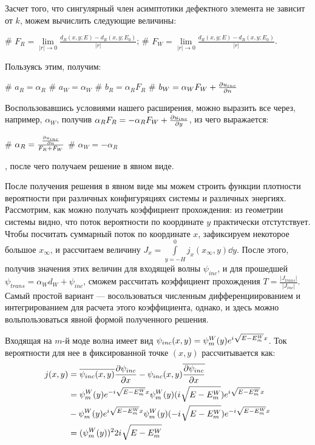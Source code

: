 Засчет того, что сингулярный член асимптотики дефектного элемента не зависит от $k$, можем вычислить следующие величины:
\begin{ilist}
# $F_R = \lim\limits_{|r| \to 0} \frac{d_R(x, y; E) - d_R(x, y; E_0)}{|r|}$;
# $F_W = \lim\limits_{|r| \to 0} \frac{d_R(x, y; E) - d_R(x, y; E_0)}{|r|}$.
\end{ilist}

Пользуясь этим, получим:
\begin{ilist}
# $a_R = \alpha_R$
# $a_W = \alpha_W$
# $b_R = \alpha_R F_R$
# $b_W = \alpha_W F_W + \pdv{u_{inc}}{n} (\vb{0})$
\end{ilist}

Воспользовавшись условиями нашего расширения, можно выразить все через, например, $\alpha_W$, получив $\alpha_R F_R = - \alpha_R F_W  + \pdv{u_{inc}}{y} (\vb{0})$, из чего выражается:
\begin{ilist}
# $\alpha_R = \frac{\pdv{u_{inc}}{n} (\vb{0})}{F_R + F_W}$
# $\alpha_W = - \alpha_R$
\end{ilist}
, после чего получаем решение в явном виде.

После получения решения в явном виде мы можем строить функции плотности вероятности при различных конфигуряциях системы и различных энергиях. Рассмотрим, как можно получать коэффициент прохождения: из геометрии системы видно, что поток вероятности по координате $y$ практически отстутствует. Чтобы посчитать суммарный поток по координате $x$, зафиксируем некоторое большое $x_\infty$, и рассчитаем величину $J_x = \int\limits_{y = -H}^0 j_x(x_\infty, y) \dd{y}$. После этого, получив значения этих величин для входящей волны $\psi_{inc}$, и для прошедшей $\psi_{trans} = \alpha_W d_W + \psi_{inc}$, сможем рассчитать коэффициент прохождения $T = \frac{|J_{trans}|}{|J_{inc}|}$. Самый простой вариант — восользоваться численным дифференциированием и интегрированием для расчета этого коэффициента, однако, и здесь можно вольпользоваться явной формой полученного решения.

Входящая на $m$-й моде волна имеет вид $\psi_{inc}(x, y) = \psi_m^W(y) e^{{i\mkern1mu} \sqrt{E - E_m^W} x}$. Ток вероятности для нее в фиксированной точке $(x, y)$ рассчитывается как:
\begin{align*}
j(x, y)
&= \overline{\psi_{inc}(x, y)} \pdv{\psi_{inc}}{x} (x, y) - \psi_{inc}(x, y) \overline{ \pdv{\psi_{inc}}{x} (x, y)} \\
&= \psi_m^W(y) e^{-{i\mkern1mu} \sqrt{E - E_m^W} x} \psi_m^W(y) ({i\mkern1mu} \sqrt{E - E_m^W}) e^{{i\mkern1mu} \sqrt{E - E_m^W} x} \\
&- \psi_m^W(y) e^{{i\mkern1mu} \sqrt{E - E_m^W} x} \psi_m^W(y) (-{i\mkern1mu} \sqrt{E - E_m^W}) e^{-{i\mkern1mu} \sqrt{E - E_m^W} x} \\
&= (\psi_m^W(y))^2 2 {i\mkern1mu} \sqrt{E - E_m^W}
\end{align*}

